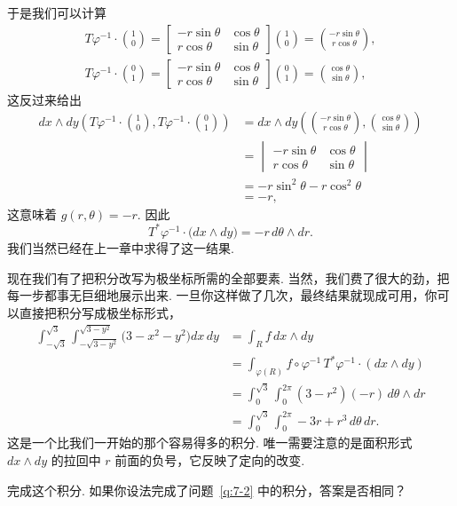 于是我们可以计算
\begin{align*}
T\varphi^{-1}\cdot\binom{1}{0}=\begin{bmatrix}-r\sin\theta&\cos\theta\\r\cos\theta&\sin\theta\end{bmatrix}\binom{1}{0}=\binom{-r\sin\theta}{r\cos\theta}, \\
T\varphi^{-1}\cdot\binom{0}{1}=\begin{bmatrix}-r\sin\theta&\cos\theta\\r\cos\theta&\sin\theta\end{bmatrix}\binom{0}{1}=\binom{\cos\theta}{\sin\theta},
\end{align*}
这反过来给出
\begin{align*}
dx\wedge dy\left(T\varphi^{-1}\cdot\binom{1}{0},T\varphi^{-1}\cdot\binom{0}{1}\right)
&=dx\wedge dy\left(\binom{-r\sin\theta}{r\cos\theta},\binom{\cos\theta}{\sin\theta}\right)\\
&=\begin{vmatrix}-r\sin\theta&\cos\theta\\r\cos\theta&\sin\theta\end{vmatrix}\\
&=-r\sin^2\theta-r\cos^2\theta\\
&=-r,
\end{align*}
这意味着 $g(r,\theta)=-r$. 因此
\[
T^*\varphi^{-1}\cdot\bigl(dx\wedge dy\bigr)=-r\,d\theta\wedge dr.
\]
我们当然已经在上一章中求得了这一结果.

现在我们有了把积分改写为极坐标所需的全部要素. 当然，我们费了很大的劲，把每一步都事无巨细地展示出来. 一旦你这样做了几次，最终结果就现成可用，你可以直接把积分写成极坐标形式，
\begin{align*}
\int_{-\sqrt{3}}^{\sqrt{3}}\int_{-\sqrt{3-y^2}}^{\sqrt{3-y^2}}\bigl(3-x^2-y^2\bigr)dx\,dy
&=\int_R f\,dx\wedge dy\\
&=\int_{\varphi(R)}f\circ\varphi^{-1}\,T^*\varphi^{-1}\cdot(dx\wedge dy)\\
&=\int_0^{\sqrt{3}}\int_0^{2\pi}(3-r^2)(-r)\,d\theta\wedge dr\\
&=\int_0^{\sqrt{3}}\int_0^{2\pi}-3r+r^3\,d\theta\,dr.
\end{align*}
这是一个比我们一开始的那个容易得多的积分. 唯一需要注意的是面积形式 $dx\wedge dy$ 的拉回中 $r$ 前面的负号，它反映了定向的改变.

\begin{question}\label{q:7-4}
完成这个积分. 如果你设法完成了问题~\ref{q:7-2} 中的积分，答案是否相同？
\end{question}


